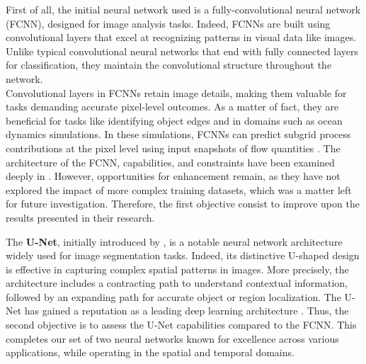 %
\newpage


\setlength{\parindent}{0pt}
First of all, the initial neural network used is a fully-convolutional neural network (FCNN), designed for image analysis tasks. Indeed, FCNNs are built using convolutional layers that excel at recognizing patterns in visual data like images. Unlike typical convolutional neural networks that end with fully connected layers for classification, they maintain the convolutional structure throughout the network.\\

Convolutional layers in FCNNs retain image details, making them valuable for tasks demanding accurate pixel-level outcomes. As a matter of fact, they are beneficial for tasks like identifying object edges and in domains such as ocean dynamics simulations. In these simulations, FCNNs can predict subgrid process contributions at the pixel level using input snapshots of flow quantities \citep{FCNN1}. The architecture of the FCNN, capabilities, and constraints have been examined deeply in \cite{Benchmarking}. However, opportunities for enhancement remain, as they have not explored the impact of more complex training datasets, which was a matter left for future investigation. Therefore, the first objective consist to improve upon the results presented in their research.

The \textbf{U-Net}, initially introduced by \cite{unet}, is a notable neural network architecture widely used for image segmentation tasks. Indeed, its distinctive U-shaped design is effective in capturing complex spatial patterns in images. More precisely, the architecture includes a contracting path to understand contextual information, followed by an expanding path for accurate object or region localization. The U-Net has gained a reputation as a leading deep learning architecture \citep{unet_example_1}. Thus, the second objective is to assess the U-Net capabilities compared to the FCNN. This completes our set of two neural networks known for excellence across various applications, while operating in the spatial and temporal domains.\\

